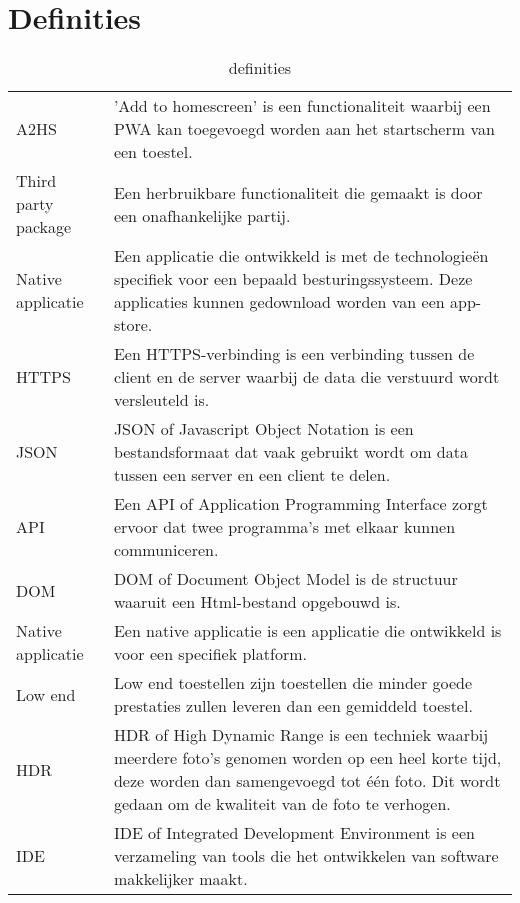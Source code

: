 

\chapter*{Definities}
\begin{table}[H]
	\begin{tabular}{p{3cm}p{10cm}}
		A2HS & 'Add to homescreen' is een functionaliteit waarbij een PWA kan toegevoegd worden aan het startscherm van een toestel.\\
		Third party package & Een herbruikbare functionaliteit die gemaakt is door een onafhankelijke partij.\\
		Native applicatie & Een applicatie die ontwikkeld is met de technologieën specifiek voor een bepaald besturingssysteem. Deze applicaties kunnen gedownload worden van een app-store.\\
		HTTPS & Een HTTPS-verbinding is een verbinding tussen de client en de server waarbij de data die verstuurd wordt versleuteld is. \\
		JSON &  JSON of Javascript Object Notation is een bestandsformaat dat vaak gebruikt wordt om data tussen een server en een client te delen. \\
		API &  Een API of Application Programming Interface zorgt ervoor dat twee programma’s met elkaar kunnen communiceren.\\
		DOM & DOM of Document Object Model is de structuur waaruit een Html-bestand opgebouwd is. \\
		Native applicatie &  Een native applicatie is een applicatie die ontwikkeld is voor een specifiek platform.\\
		Low end & Low end toestellen zijn toestellen die minder goede prestaties zullen leveren dan een gemiddeld toestel. \\
		HDR & HDR of High Dynamic Range is een techniek waarbij meerdere foto’s genomen worden op een heel korte tijd, deze worden dan samengevoegd tot één foto. Dit wordt gedaan om de kwaliteit van de foto te verhogen. \\
		IDE & IDE of Integrated Development Environment is een verzameling van tools die het ontwikkelen van software makkelijker maakt.
	\end{tabular}	
	\caption{definities }
\end{table}
